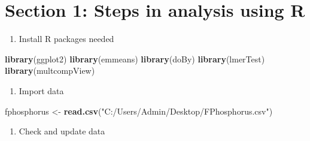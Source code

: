 \documentclass[]{book}
\newenvironment{Shaded}{\begin{snugshade}}{\end{snugshade}}
\newcommand{\KeywordTok}[1]{\textcolor[rgb]{0.13,0.29,0.53}{\textbf{#1}}}
\newcommand{\StringTok}[1]{\textcolor[rgb]{0.31,0.60,0.02}{#1}}
\newcommand{\OperatorTok}[1]{\textcolor[rgb]{0.81,0.36,0.00}{\textbf{#1}}}
\newcommand{\NormalTok}[1]{#1}
\providecommand{\tightlist}{%
  \setlength{\itemsep}{0pt}\setlength{\parskip}{0pt}}
\theoremstyle{definition}
\theoremstyle{definition}
\theoremstyle{definition}
\theoremstyle{remark}
\begin{document}
\section{Section 1: Steps in analysis using
R}\label{section-1-steps-in-analysis-using-r-1}

\begin{enumerate}
\def\labelenumi{\arabic{enumi}.}
\tightlist
\item
  Install R packages needed
\end{enumerate}

\begin{Shaded}
\begin{Highlighting}[]
\KeywordTok{library}\NormalTok{(ggplot2)}
\KeywordTok{library}\NormalTok{(emmeans)}
\KeywordTok{library}\NormalTok{(doBy)}
\KeywordTok{library}\NormalTok{(lmerTest)}
\KeywordTok{library}\NormalTok{(multcompView)}
\end{Highlighting}
\end{Shaded}

\begin{enumerate}
\def\labelenumi{\arabic{enumi}.}
\setcounter{enumi}{1}
\tightlist
\item
  Import data
\end{enumerate}

\begin{Shaded}
\begin{Highlighting}[]
\NormalTok{fphosphorus  <-}\StringTok{ }\KeywordTok{read.csv}\NormalTok{(}\StringTok{"C:/Users/Admin/Desktop/FPhosphorus.csv"}\NormalTok{)}
\end{Highlighting}
\end{Shaded}

\begin{enumerate}
\def\labelenumi{\arabic{enumi}.}
\setcounter{enumi}{2}
\tightlist
\item
  Check and update data
\end{enumerate}

\begin{Shaded}
\end{Shaded}
\end{document}
